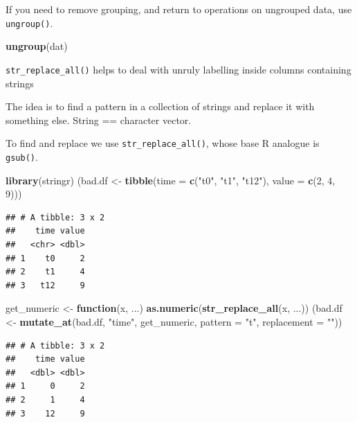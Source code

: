 \documentclass[]{book}
\newenvironment{Shaded}{\begin{snugshade}}{\end{snugshade}}
\newcommand{\KeywordTok}[1]{\textcolor[rgb]{0.13,0.29,0.53}{\textbf{#1}}}
\newcommand{\DataTypeTok}[1]{\textcolor[rgb]{0.13,0.29,0.53}{#1}}
\newcommand{\DecValTok}[1]{\textcolor[rgb]{0.00,0.00,0.81}{#1}}
\newcommand{\StringTok}[1]{\textcolor[rgb]{0.31,0.60,0.02}{#1}}
\newcommand{\ControlFlowTok}[1]{\textcolor[rgb]{0.13,0.29,0.53}{\textbf{#1}}}
\newcommand{\NormalTok}[1]{#1}
\begin{document}
If you need to remove grouping, and return to operations on ungrouped
data, use \texttt{ungroup()}.

\begin{Shaded}
\begin{Highlighting}[]
\KeywordTok{ungroup}\NormalTok{(dat) }
\end{Highlighting}
\end{Shaded}

\texttt{str\_replace\_all()} helps to deal with unruly labelling inside
columns containing strings

The idea is to find a pattern in a collection of strings and replace it
with something else. String == character vector.

To find and replace we use \texttt{str\_replace\_all()}, whose base R
analogue is \texttt{gsub()}.

\begin{Shaded}
\begin{Highlighting}[]
\KeywordTok{library}\NormalTok{(stringr)}
\NormalTok{(bad.df <-}\StringTok{ }\KeywordTok{tibble}\NormalTok{(}\DataTypeTok{time =} \KeywordTok{c}\NormalTok{(}\StringTok{"t0"}\NormalTok{, }\StringTok{"t1"}\NormalTok{, }\StringTok{"t12"}\NormalTok{), }\DataTypeTok{value =} \KeywordTok{c}\NormalTok{(}\DecValTok{2}\NormalTok{, }\DecValTok{4}\NormalTok{, }\DecValTok{9}\NormalTok{)))}
\end{Highlighting}
\end{Shaded}

\begin{verbatim}
## # A tibble: 3 x 2
##    time value
##   <chr> <dbl>
## 1    t0     2
## 2    t1     4
## 3   t12     9
\end{verbatim}

\begin{Shaded}
\begin{Highlighting}[]
\NormalTok{get_numeric <-}\StringTok{ }\ControlFlowTok{function}\NormalTok{(x, ...) }\KeywordTok{as.numeric}\NormalTok{(}\KeywordTok{str_replace_all}\NormalTok{(x, ...))}
\NormalTok{(bad.df <-}\StringTok{ }\KeywordTok{mutate_at}\NormalTok{(bad.df, }\StringTok{"time"}\NormalTok{, get_numeric, }\DataTypeTok{pattern =} \StringTok{"t"}\NormalTok{, }\DataTypeTok{replacement =} \StringTok{""}\NormalTok{))}
\end{Highlighting}
\end{Shaded}

\begin{verbatim}
## # A tibble: 3 x 2
##    time value
##   <dbl> <dbl>
## 1     0     2
## 2     1     4
## 3    12     9
\end{verbatim}
\end{document}

